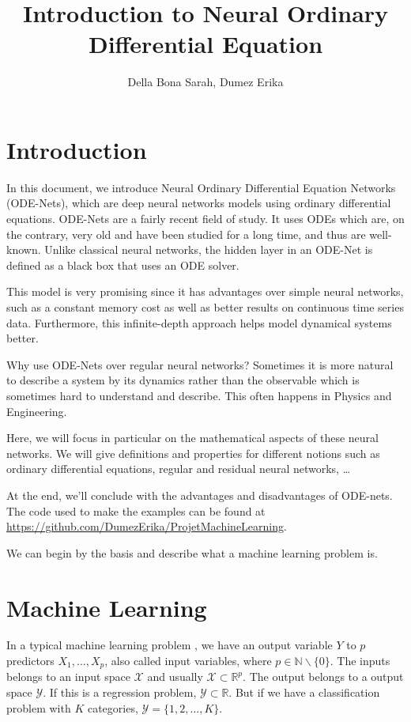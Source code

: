 \documentclass[10pt,a4paper]{article}
\author{Della Bona Sarah, Dumez Erika}
\title{Introduction to Neural Ordinary Differential Equation}
\theoremstyle{definition}
\theoremstyle{plain}
\begin{document}
\maketitle

\newpage
\tableofcontents

\newpage
\section{Introduction}

In this document, we introduce Neural Ordinary Differential Equation Networks (ODE-Nets), which are deep neural networks models using ordinary differential equations. 
ODE-Nets are a fairly recent field of study. It uses ODEs which are, on the contrary, very old and have been studied for a long time, and thus are well-known. Unlike classical neural networks, the hidden layer in an ODE-Net is defined as a black box that uses an ODE solver.

This model is very promising since it has advantages over simple neural networks, such as a constant memory cost as well as better results on continuous time series data. Furthermore, this infinite-depth approach helps model dynamical systems better.

Why use ODE-Nets over regular neural networks? Sometimes it is more natural to describe a system by its dynamics rather than the observable which is sometimes hard to understand and describe. This often happens in Physics and Engineering.

Here, we will focus in particular on the mathematical aspects of these neural networks. We will give definitions and properties for different notions such as ordinary differential equations, regular and residual neural networks, \dots

At the end, we'll conclude with the advantages and disadvantages of ODE-nets.
The code used to make the examples can be found at \url{https://github.com/DumezErika/ProjetMachineLearning}.

We can begin by the basis and describe what a machine learning problem is.

\section{Machine Learning}
In a typical machine learning problem \cite{7}, we have an output variable $Y$ to $p$ predictors $X_1,\dots, X_p$, also called input variables, where $p\in \mathbb{N}\backslash \{0\}$. The inputs belongs to an input space $\mathcal{X}$ and usually $\mathcal{X} \subset \mathbb{R}^p$. The output belongs to a output space $\mathcal{Y}$. If this is a regression problem, $\mathcal{Y} \subset \mathbb{R}$. But if we have a classification problem with $K$ categories, $\mathcal{Y} = \{1,2,\dots, K\}$.
\end{document}
